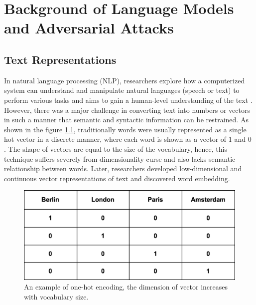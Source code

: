 \documentclass[%
	BCOR=8mm, %
	DIV=12,
	toc=bibliography, %
	toc=listof, %
	oneside, %
	egregdoesnotlikesansseriftitles, %
	]{scrbook}
\begin{document}
\chapter{Background of Language Models and Adversarial Attacks}
\label{section:background}
\section{Text Representations}
\label{section: textrep}
In natural language processing (NLP), researchers explore how a computerized system can understand and manipulate natural languages (speech or text) to perform various tasks \cite{chowdhury_natural_2003} and aims to gain a human-level understanding of the text \cite{naseem_comprehensive_2020}. However, there was a major challenge in converting text into numbers or vectors in such a manner that semantic and syntactic information can be restrained. As shown in the figure \ref{fig:onehot}, traditionally words were usually represented as a single hot vector in a discrete manner, where each word is shown as a vector of 1 and 0 \cite{salton_vector_1975}. The shape of vectors are equal to the size of the vocabulary, hence, this technique suffers severely from dimensionality curse and also lacks semantic relationship between words. Later, researchers developed low-dimensional and continuous vector representations of text and discovered word embedding.
\begin{figure}[h!]
    \centering
    \includegraphics[width=0.5\linewidth]{img/onehot.png}
    \caption[Example of one-hot encoding.]{ An example of one-hot encoding, the dimension of vector increases with vocabulary size.}
    \label{fig:onehot}
\end{figure}
\end{document}
